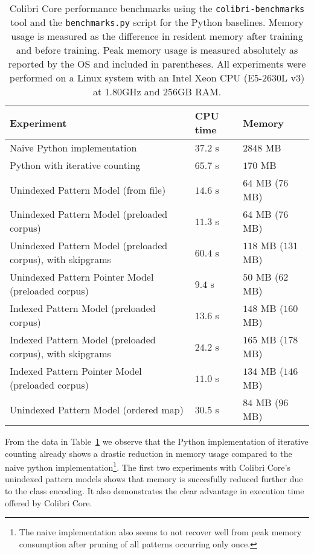 \documentclass[a4paper,12pt]{article}
\begin{document}
\begin{table}[h]
\footnotesize{
\begin{tabular}{lll}
Experiment & CPU time & Memory  \\
\hline
Naive Python implementation & $37.2$ s & $2848$ MB \\
Python with iterative counting  & $65.7$ s & $170$ MB \\
\hline
Unindexed Pattern Model (from file) & $14.6$ s & $64$ MB ($76$ MB) \\
Unindexed Pattern Model (preloaded corpus) & $11.3$ s & $64$ MB ($76$ MB) \\
Unindexed Pattern Model (preloaded corpus), with skipgrams & $60.4$ s & $118$ MB ($131$ MB) \\
Unindexed Pattern Pointer Model (preloaded corpus)  & $9.4$ s & $50$ MB ($62$ MB) \\
Indexed Pattern Model (preloaded corpus) & $13.6$ s & $148$ MB ($160$ MB) \\
Indexed Pattern Model (preloaded corpus), with skipgrams & $24.2$ s & $165$ MB ($178$ MB) \\
Indexed Pattern Pointer Model (preloaded corpus) & $11.0$ s & $134$ MB ($146$ MB) \\
Unindexed Pattern Model (ordered map) & $30.5$ s & $84$ MB ($96$ MB) \\
\end{tabular}
\caption{Colibri Core performance benchmarks using the \texttt{colibri-benchmarks} tool and the 
\texttt{benchmarks.py} script for the Python baselines. Memory usage is measured as the difference in resident memory after training
and before training. Peak memory usage is measured absolutely as reported by
the OS and included in parentheses. All experiments were performed on a Linux system
with an Intel Xeon CPU (E5-2630L v3) at 1.80GHz and 256GB RAM.
}
}
\label{tab:benchmarks}
\end{table}

From the data in Table~\ref{tab:benchmarks} we observe that the Python
implementation of iterative counting already shows a drastic reduction in
memory usage compared to the naive python implementation\footnote{The naive
    implementation also seems to not recover well from peak memory consumption
after pruning of all patterns occurring only once.}. The first two experiments
with Colibri Core's unindexed pattern models shows that memory is succesfully
reduced further due to the class encoding. It also demonstrates the clear
advantage in execution time offered by Colibri Core.
\end{document}
